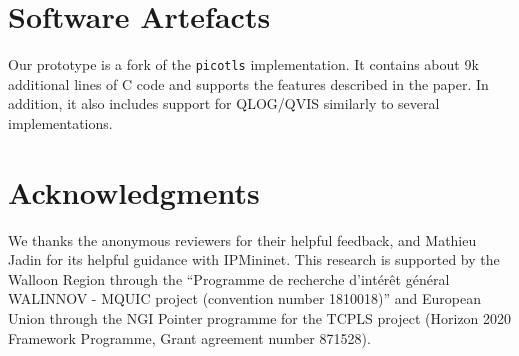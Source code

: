 %


\section*{Software Artefacts}

Our \tcpls prototype is a fork of the \texttt{picotls}  implementation.
It contains about 9k additional lines of C code and supports the features
described in the paper. In addition, it also includes support for QLOG/QVIS
\cite{marx2020debugging} similarly to several \quic implementations.


\section*{Acknowledgments}

We thanks the anonymous reviewers for their helpful feedback, and Mathieu Jadin
for its helpful guidance with IPMininet. This research is supported by the Walloon
Region through the ``Programme de recherche d'intérêt général
WALINNOV - MQUIC project (convention number 1810018)'' and European Union
through the NGI Pointer programme for the TCPLS project (Horizon 2020 Framework
Programme, Grant agreement number 871528).


